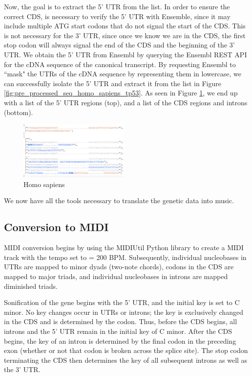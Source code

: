 \documentclass[letterpaper]{article}
\begin{document}
Now, the goal is to extract the 5' UTR from the list. In order to ensure the correct CDS, is necessary to verify the 5' UTR with Ensemble, since it may include multiple ATG start codons that do not signal the start of the CDS. This is not necessary for the 3' UTR, since once we know we are in the CDS, the first stop codon will always signal the end of the CDS and the beginning of the 3' UTR. We obtain the 5' UTR from Ensembl by querying the Ensembl REST API for the cDNA sequence of the canonical transcript. By requesting Ensembl to ``mask" the UTRs of the cDNA sequence by representing them in lowercase, we can successfully isolate the 5' UTR and extract it from the list in Figure \ref{fig:pre_processed_seq_homo_sapiens_tp53}. As seen in Figure \ref{fig:post_processed_seq_homo_sapiens_tp53}, we end up with a list of the 5' UTR regions (top), and a list of the CDS regions and introns (bottom).\cite{10.1162/artl_a_00325}

\begin{figure}[h!]
\centering
\includegraphics[width=0.48\textwidth]{images/post_processed_seq_homo_sapiens_tp53_ABBREV}
\vspace{-3mm}
  \caption{Homo sapiens}\label{fig:post_processed_seq_homo_sapiens_tp53}
  \vspace{-3mm}
\end{figure}

We now have all the tools necessary to translate the genetic data into music.

\subsection{Conversion to MIDI}

MIDI conversion begins by using the MIDIUtil Python library to create a MIDI track with the tempo set to \musQuarter\;= 200 BPM. Subsequently, individual nucleobases in UTRs are mapped to minor dyads (two-note chords), codons in the CDS are mapped to major triads, and individual nucleobases in introns are mapped diminished triads. 

Sonification of the gene begins with the 5' UTR, and the initial key is set to C minor. No key changes occur in UTRs or introns; the key is exclusively changed in the CDS and is determined by the codon. Thus, before the CDS begins, all introns and the 5' UTR remain in the initial key of C minor. After the CDS begins, the key of an intron is determined by the final codon in the preceding exon (whether or not that codon is broken across the splice site). The stop codon terminating the CDS then determines the key of all subsequent introns as well as the 3' UTR.
\end{document}
